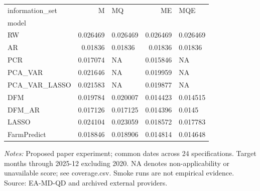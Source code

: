 \begin{threeparttable}
\begin{tabular}{lrlrl}
\toprule
information\_set & M & MQ & ME & MQE \\
model &  &  &  &  \\
\midrule
RW & 0.026469 & 0.026469 & 0.026469 & 0.026469 \\
AR & 0.01836 & 0.01836 & 0.01836 & 0.01836 \\
PCR & 0.017074 & NA & 0.015846 & NA \\
PCA\_VAR & 0.021646 & NA & 0.019959 & NA \\
PCA\_VAR\_LASSO & 0.021583 & NA & 0.019877 & NA \\
DFM & 0.019784 & 0.020007 & 0.014423 & 0.014515 \\
DFM\_AR & 0.017126 & 0.017125 & 0.014396 & 0.0145 \\
LASSO & 0.024104 & 0.023059 & 0.018572 & 0.017783 \\
FarmPredict & 0.018846 & 0.018906 & 0.014814 & 0.014648 \\
\bottomrule
\end{tabular}
\begin{tablenotes}[flushleft]\footnotesize
\item \textit{Notes:} Proposed paper experiment; common dates across 24 specifications. Target months through 2025-12 excluding 2020. NA denotes non-applicability or unavailable score; see coverage.csv. Smoke runs are not empirical evidence. Source: EA-MD-QD and archived external providers.
\end{tablenotes}
\end{threeparttable}
